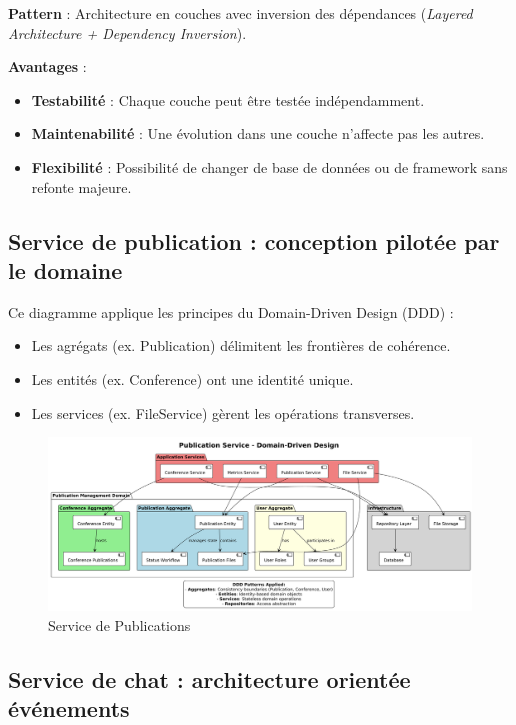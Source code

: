 \documentclass{rapportPfe}
\begin{document}
\textbf{Pattern} : Architecture en couches avec inversion des dépendances (\textit{Layered Architecture + Dependency Inversion}).

\textbf{Avantages} :
\begin{itemize}[label=+]
    \item \textbf{Testabilité} : Chaque couche peut être testée indépendamment.
    \item \textbf{Maintenabilité} : Une évolution dans une couche n’affecte pas les autres.
    \item \textbf{Flexibilité} : Possibilité de changer de base de données ou de framework sans refonte majeure.
\end{itemize}


\subsection{Service de publication : conception pilotée par le domaine}
Ce diagramme applique les principes du Domain-Driven Design (DDD) :

\begin{itemize}
    \item Les agrégats (ex. Publication) délimitent les frontières de cohérence.
    \item Les entités (ex. Conference) ont une identité unique.
    \item Les services (ex. FileService) gèrent les opérations transverses.
\end{itemize}

\begin{figure}[htbp]
    \centering
    \includegraphics[width=1.1\textwidth]{diagrams/diagram3.png}
    \caption{Service de Publications }
    \label{fig:diagram3}
\end{figure}

\FloatBarrier
\subsection{Service de chat : architecture orientée événements}
\end{document}
